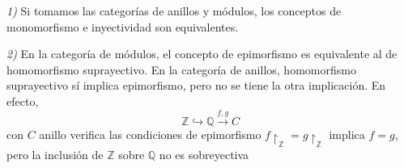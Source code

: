 \documentclass[../main.tex]{subfiles}
\begin{document}
\begin{remark}
\textit{1)} Si tomamos las categorías de anillos y módulos, los conceptos de monomorfismo e inyectividad son equivalentes.

\textit{2)} En la categoría de módulos, el concepto de epimorfismo es equivalente al de homomorfismo suprayectivo. En la categoría de anillos, homomorfismo suprayectivo sí implica epimorfismo, pero no se tiene la otra implicación. En efecto, $$\mathbb{Z}\hookrightarrow \mathbb{Q}\overset{f,g}{\longrightarrow}C$$con $C$ anillo verifica las condiciones de epimorfismo $f\restriction_{\mathbb{Z}}= g\restriction_{\mathbb{Z}}$ implica $f=g$, pero la inclusión de $\mathbb{Z}$ sobre $\mathbb{Q}$ no es sobreyectiva
\end{remark}
\end{document}
